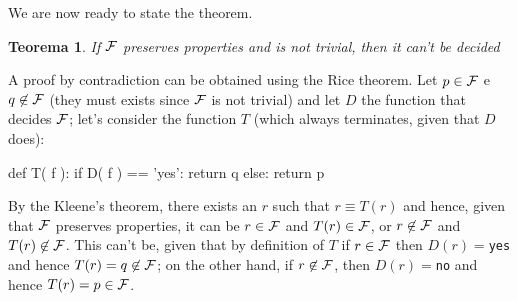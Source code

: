 \documentclass[a4paper]{article}
\newtheorem{teo}{Teorema}
\begin{document}
We are now ready to state the theorem.

\begin{teo}
If $\cal F$ preserves properties and is not trivial, then it can't be decided
\end{teo}

A proof by contradiction can be obtained using the Rice theorem. Let $p\in\cal
F$ e $q\not\in\cal F$ (they must exists since $\cal F$ is not trivial) and let
$D$ the function that decides  $\cal F$; let's consider the function $T$
(which always terminates, given that $D$ does):

\begin{pycode}
def T( f ):
  if D( f ) == 'yes':
    return q
  else:
    return p
\end{pycode}

By the Kleene's theorem, there exists an $r$ such that $r\equiv T(r)$ and
hence, given that $\cal F$ preserves properties, it can be $r\in\cal F$ and
$T(r)\in\cal F$, or $r\not\in\cal F$ and $T(r)\not\in\cal F$. This can't be,
given that by definition of $T$ if $r\in\cal F$ then $D(r)=$\verb|yes| and
hence $T(r)=q\not\in\cal F$; on the other hand, if $r\not\in\cal F$, then
$D(r)=$\verb|no| and hence $T(r)=p\in\cal F$.
\end{document}
